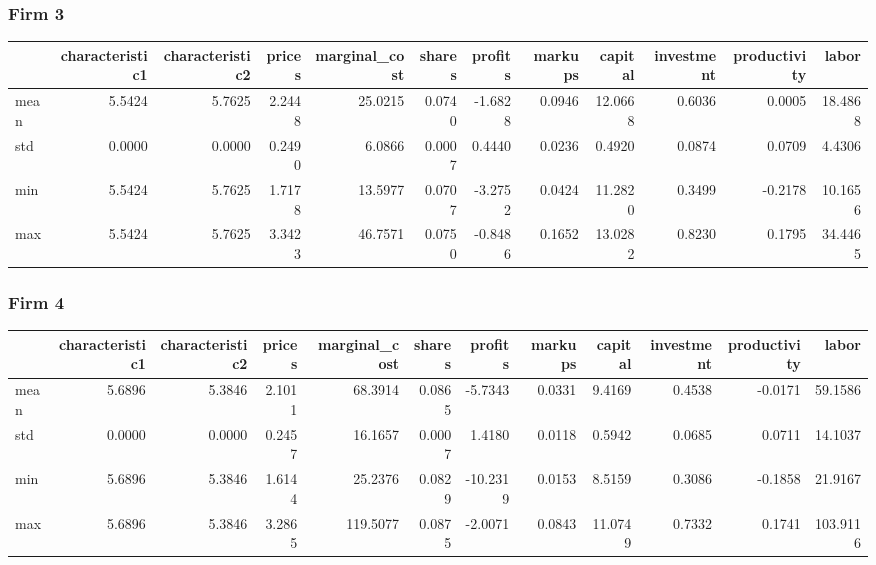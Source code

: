  \subsubsection*{Firm 3}
\begin{tabular}{lrrrrrrrrrrr}
\toprule
{} &  characteristic1 &  characteristic2 &  prices &  marginal\_cost &  shares &  profits &  markups &  capital &  investment &  productivity &   labor \\
\midrule
mean &           5.5424 &           5.7625 &  2.2448 &        25.0215 &  0.0740 &  -1.6828 &   0.0946 &  12.0668 &      0.6036 &        0.0005 & 18.4868 \\
std  &           0.0000 &           0.0000 &  0.2490 &         6.0866 &  0.0007 &   0.4440 &   0.0236 &   0.4920 &      0.0874 &        0.0709 &  4.4306 \\
min  &           5.5424 &           5.7625 &  1.7178 &        13.5977 &  0.0707 &  -3.2752 &   0.0424 &  11.2820 &      0.3499 &       -0.2178 & 10.1656 \\
max  &           5.5424 &           5.7625 &  3.3423 &        46.7571 &  0.0750 &  -0.8486 &   0.1652 &  13.0282 &      0.8230 &        0.1795 & 34.4465 \\
\bottomrule
\end{tabular}


 \subsubsection*{Firm 4}
\begin{tabular}{lrrrrrrrrrrr}
\toprule
{} &  characteristic1 &  characteristic2 &  prices &  marginal\_cost &  shares &  profits &  markups &  capital &  investment &  productivity &    labor \\
\midrule
mean &           5.6896 &           5.3846 &  2.1011 &        68.3914 &  0.0865 &  -5.7343 &   0.0331 &   9.4169 &      0.4538 &       -0.0171 &  59.1586 \\
std  &           0.0000 &           0.0000 &  0.2457 &        16.1657 &  0.0007 &   1.4180 &   0.0118 &   0.5942 &      0.0685 &        0.0711 &  14.1037 \\
min  &           5.6896 &           5.3846 &  1.6144 &        25.2376 &  0.0829 & -10.2319 &   0.0153 &   8.5159 &      0.3086 &       -0.1858 &  21.9167 \\
max  &           5.6896 &           5.3846 &  3.2865 &       119.5077 &  0.0875 &  -2.0071 &   0.0843 &  11.0749 &      0.7332 &        0.1741 & 103.9116 \\
\bottomrule
\end{tabular}


